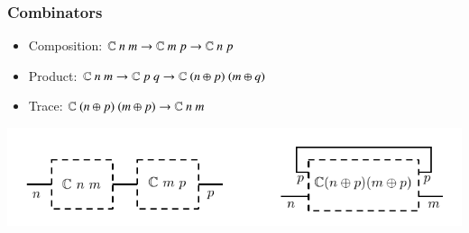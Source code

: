 \documentclass[9pt]{beamer}
\begin{document}
\begin{frame}\frametitle{Combinators}


  \begin{itemize}
  \item Composition: $\mathbb{C}~n~m \to \mathbb{C}~m~p \to\mathbb{C}~n~p$
    

  \item Product: $\mathbb{C}~n~m \to \mathbb{C}~p~q \to \mathbb{C}~(n\oplus p)~(m\oplus q)$

  \item Trace: $\mathbb{C}~(n\oplus p)~(m \oplus p) \to \mathbb{C}~n~m$
  \end{itemize}
  \begin{center}
      \includegraphics[width=0.7\linewidth]{figs/type}
  \end{center}

\end{frame}
\end{document}
